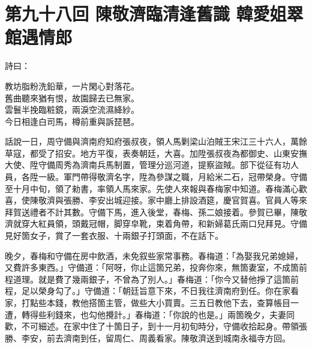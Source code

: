 
\chapter*{第九十八回 陳敬濟臨清逢舊識 韓愛姐翠館遇情郎}


詩曰：

\begin{myquote}
教坊脂粉洗鉛華，一片閑心對落花。\\舊曲聽來猶有恨，故園歸去已無家。\\雲鬟半挽臨粧鏡，兩淚空流濕絳紗。\\今日相逢白司馬，樽前重與訴琵琶。
\end{myquote}

話說一日，周守備與濟南府知府張叔夜，領人馬剿梁山泊賊王宋江三十六人，萬餘草寇，都受了招安。地方平復，表奏朝廷，大喜。加陞張叔夜為都御史、山東安撫大使、陞守備周秀為濟南兵馬制置，管理分巡河道，提察盜賊。部下從征有功人員，各陞一級。軍門帶得敬濟名字，陞為參謀之職，月給米二石，冠帶榮身。守備至十月中旬，領了勑書，率領人馬來家。先使人來報與春梅家中知道。春梅滿心歡喜，使陳敬濟與張勝、李安出城迎接。家中廳上排設酒筵，慶官賀喜。官員人等來拜賀送禮者不計其數。守備下馬，進入後堂，春梅、孫二娘接着。參賀已畢，陳敬濟就穿大紅員領，頭戴冠帽，脚穿皁靴，束着角帶，和新婦葛氏兩口兒拜見。{}守備見好箇女子，賞了一套衣服、十兩銀子打頭面，不在話下。

晚夕，春梅和守備在房中飲酒，未免叙些家常事務。春梅道：「為娶我兄弟媳婦，又費許多東西。」守備道：「阿呀，你止這箇兄弟，投奔你來，無箇妻室，不成箇前程道理。就是費了幾兩銀子，不曾為了別人。」春梅道：「你今又替他掙了這箇前程，足以榮身勾了。」守備道：「朝廷旨意下來，不日我往濟南府到任。你在家看家，打點些本錢，教他搭箇主管，做些大小買賣。三五日教他下去，查算帳目一遭，轉得些利錢來，也勾他攪計。」{}春梅道：「你說的也是。」兩箇晚夕，夫妻同歡，不可細述。在家中住了十箇日子，到十一月初旬時分，守備收拾起身。帶領張勝、李安，前去濟南到任，留周仁、周義看家。陳敬濟送到城南永福寺方回。

